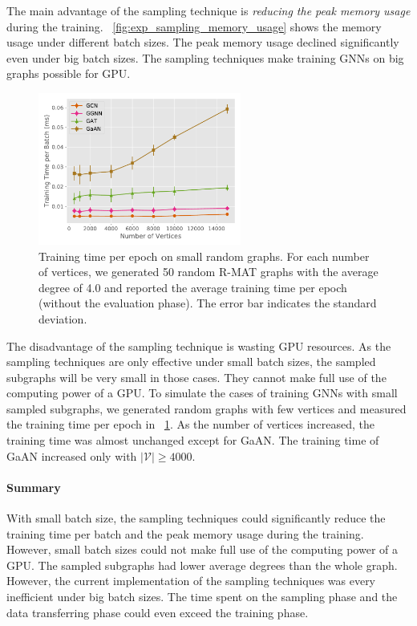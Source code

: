 The main advantage of the sampling technique is \emph{reducing the peak memory usage} during the training.
\figurename~\ref{fig:exp_sampling_memory_usage} shows the memory usage under different batch sizes.
The peak memory usage declined significantly even under big batch sizes.
The sampling techniques make training GNNs on big graphs possible for GPU.

\begin{figure}
    \centering
    \includegraphics[height=5cm]{figs/experiments/exp_small_graph_train_time.pdf}
    \caption{Training time per epoch on small random graphs. For each number of vertices, we generated 50 random R-MAT graphs with the average degree of 4.0 and reported the average training time per epoch (without the evaluation phase). The error bar indicates the standard deviation.}
    \label{fig:exp_small_graph_train_time}
\end{figure}

The disadvantage of the sampling technique is wasting GPU resources.
As the sampling techniques are only effective under small batch sizes, the sampled subgraphs will be very small in those cases.
They cannot make full use of the computing power of a GPU.
To simulate the cases of training GNNs with small sampled subgraphs, we generated random graphs with few vertices and measured the training time per epoch in \figurename~\ref{fig:exp_small_graph_train_time}.
As the number of vertices increased, the training time was almost unchanged except for GaAN.
The training time of GaAN increased only with $|\mathcal{V}| \geq 4000$.


\paragraph{Summary}
With small batch size, the sampling techniques could significantly reduce the training time per batch and the peak memory usage during the training.
However, small batch sizes could not make full use of the computing power of a GPU.
The sampled subgraphs had lower average degrees than the whole graph.
However, the current implementation of the sampling techniques was every inefficient under big batch sizes.
The time spent on the sampling phase and the data transferring phase could even exceed the training phase.